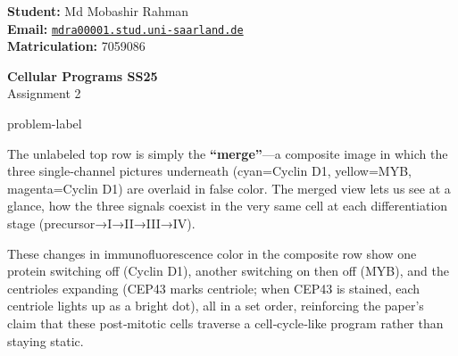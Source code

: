 




\noindent
\begin{minipage}[t]{0.55\textwidth}
    \textsf{\textbf{Student:}} Md Mobashir Rahman \\
    \textbf{Email:} \href{mailto:mdra00001.stud.uni-saarland.de}{\texttt{mdra00001.stud.uni-saarland.de}} \\
    \textsf{\textbf{Matriculation:}} 7059086
\end{minipage}
\hfill
\begin{minipage}[t]{0.4\textwidth}
    \raggedleft
    \begin{Large}
        \textsf{\textbf{Cellular Programs SS25}}\\
        Assignment 2
    \end{Large}
\end{minipage}


\vspace{2ex}















\begin{problem}{}{problem-label}
        

The unlabeled top row is simply the \textbf{“merge”}—a composite image in which the three single‑channel pictures underneath (cyan=Cyclin D1, yellow=MYB, magenta=Cyclin D1) are overlaid in false color. The merged view lets us see at a glance, how the three signals coexist in the very same cell at each differentiation stage (precursor→I→II→III→IV).

These changes in immunofluorescence color in the composite row show one protein switching off (Cyclin D1), another switching on then off (MYB), and the centrioles expanding (CEP43 marks centriole; when CEP43 is stained, each centriole lights up as a bright dot), all in a set order, reinforcing the paper’s claim that these post‑mitotic cells traverse a cell‑cycle‑like program rather than staying static.

\end{problem}




















